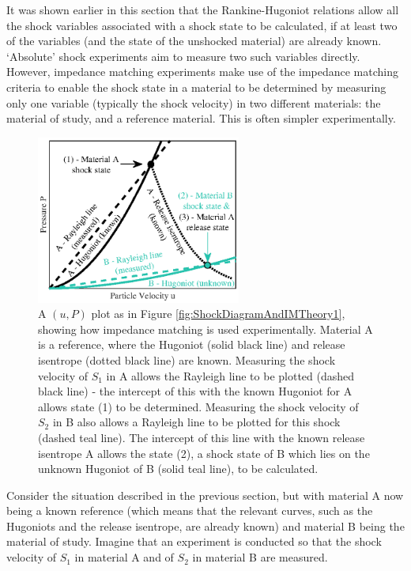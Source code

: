 
It was shown earlier in this section that the Rankine-Hugoniot relations allow all the shock variables associated with a shock state to be calculated, if at least two of the variables (and the state of the unshocked material) are already known. `Absolute' shock experiments aim to measure two such variables directly. However, impedance matching experiments make use of the impedance matching criteria to enable the shock state in a material to be determined by measuring only one variable (typically the shock velocity) in two different materials: the material of study, and a reference material. This is often simpler experimentally.

\begin{figure}
\centering
\includegraphics[width=0.6\textwidth]{figures/Theory/MatlabIM2.eps}%
\caption{\label{fig:IMTheory2} A $(u, P)$ plot as in Figure \ref{fig:ShockDiagramAndIMTheory1}, showing how impedance matching is used experimentally. Material A is a reference, where the Hugoniot (solid black line) and release isentrope (dotted black line) are known. Measuring the shock velocity of $S_1$ in A allows the Rayleigh line to be plotted (dashed black line) - the intercept of this with the known Hugoniot for A allows state (1) to be determined. Measuring the shock velocity of $S_2$ in B also allows a Rayleigh line to be plotted for this shock (dashed teal line). The intercept of this line with the known release isentrope A allows the state (2), a shock state of B which lies on the unknown Hugoniot of B (solid teal line), to be calculated.}
\end{figure}

Consider the situation described in the previous section, but with material A now being a known reference (which means that the relevant curves, such as the Hugoniots and the release isentrope, are already known) and material B being the material of study. Imagine that an experiment is conducted so that the shock velocity of $S_1$ in material A and of $S_2$ in material B are measured.

